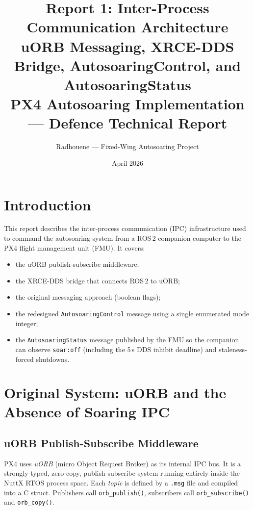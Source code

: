 \documentclass[12pt,a4paper]{article}
\title{\textbf{Report 1: Inter-Process Communication Architecture}\\
\large uORB Messaging, XRCE-DDS Bridge, AutosoaringControl, and AutosoaringStatus\\[0.5em]
\normalsize PX4 Autosoaring Implementation --- Defence Technical Report}
\author{Radhouene --- Fixed-Wing Autosoaring Project}
\date{April 2026}
\begin{document}
\maketitle
\tableofcontents
\newpage

\section{Introduction}

This report describes the inter-process communication (IPC) infrastructure
used to command the autosoaring system from a ROS\,2 companion computer to
the PX4 flight management unit (FMU). It covers:

\begin{itemize}
  \item the uORB publish-subscribe middleware;
  \item the XRCE-DDS bridge that connects ROS\,2 to uORB;
  \item the original messaging approach (boolean flags);
  \item the redesigned \texttt{AutosoaringControl} message using a single
        enumerated mode integer;
  \item the \texttt{AutosoaringStatus} message published by the FMU so the
        companion can observe \texttt{soar:off} (including the 5\,s DDS inhibit
        deadline) and staleness-forced shutdowns.
\end{itemize}

\section{Original System: uORB and the Absence of Soaring IPC}

\subsection{uORB Publish-Subscribe Middleware}

PX4 uses \emph{uORB} (micro Object Request Broker) as its internal IPC
bus. It is a strongly-typed, zero-copy, publish-subscribe system running
entirely inside the NuttX RTOS process space. Each \emph{topic} is defined
by a \texttt{.msg} file and compiled into a C struct. Publishers call
\texttt{orb\_publish()}, subscribers call \texttt{orb\_subscribe()} and
\texttt{orb\_copy()}.
\end{document}
